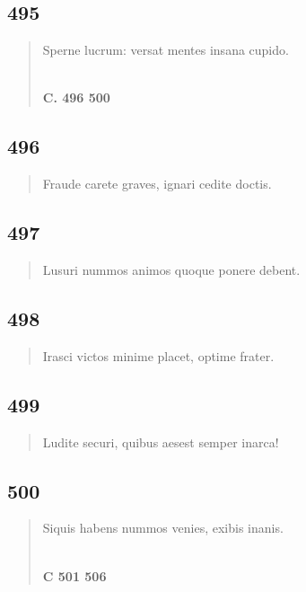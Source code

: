 \documentclass[11pt, a4paper]{report}
\begin{document}
            \subsection*{495}
      \begin{verse}
      Sperne lucrum: versat mentes insana cupido. \\ 
        ﻿\pagebreak 
    \begin{center} \textbf{C. 496 500} \end{center} \marginpar{[60]} 
      \end{verse}
  
            \subsection*{496}
      \begin{verse}
      Fraude carete graves, ignari cedite doctis. \\ 
      \end{verse}
  
            \subsection*{497}
      \begin{verse}
      Lusuri nummos animos quoque ponere debent. \\ 
      \end{verse}
  
            \subsection*{498}
      \begin{verse}
      Irasci victos minime placet, optime frater. \\ 
      \end{verse}
  
            \subsection*{499}
      \begin{verse}
      Ludite securi, quibus aesest semper inarca! \\ 
      \end{verse}
  
            \subsection*{500}
      \begin{verse}
      Siquis habens nummos venies, exibis inanis. \\ 
        ﻿\pagebreak 
    \begin{center} \textbf{C 501 506} \end{center}
      \end{verse}
  
\end{document}
